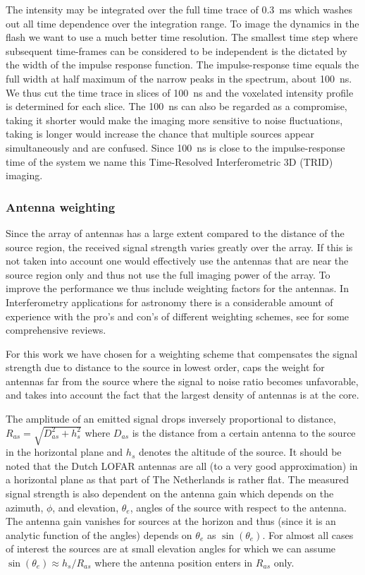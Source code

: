 The intensity may be integrated over the full time trace of 0.3~ms which washes out all time dependence over the integration range. To image the dynamics in the flash we want to use a much better time resolution. The smallest time step where subsequent time-frames can be considered to be independent is the dictated by the width of the impulse response function. The impulse-response time equals the full width at half maximum of the narrow peaks in the spectrum, about 100~ns. We thus cut the time trace in slices of 100~ns and the voxelated intensity profile is determined for each slice. The 100~ns can also be regarded as a compromise, taking it shorter would make the imaging more sensitive to noise fluctuations, taking is longer would increase the chance that multiple sources appear simultaneously and are confused. Since 100~ns is close to the impulse-response time of the system we name this Time-Resolved Interferometric 3D (TRID) imaging.


\subsubsection{Antenna weighting}

Since the array of antennas has a large extent compared to the distance of the source region, the received signal strength varies greatly over the array. If this is not taken into account one would effectively use the antennas that are near the source region only and thus not use the full imaging power of the array. To improve the performance we thus include weighting factors for the antennas. In Interferometry applications for astronomy there is a considerable amount of experience with the pro's and con's of different weighting schemes, see\cite{Briggs:1999, Yatawatta:2014} for some comprehensive reviews.

For this work we have chosen for a weighting scheme that compensates the signal strength due to distance to the source in lowest order, caps the weight for antennas far from the source where the signal to noise ratio becomes unfavorable, and takes into account the fact that the largest density of antennas is at the core.

The amplitude of an emitted signal drops inversely proportional to distance, $R_{as}=\sqrt{D_{as}^2+h_s^2}$ where $D_{as}$ is the distance from a certain antenna to the source in the horizontal plane and $h_s$ denotes the altitude of the source. It should be noted that the Dutch LOFAR antennas are all (to a very good approximation) in a horizontal plane as that part of The Netherlands is rather flat. The measured signal strength is also dependent on the antenna gain which depends on the azimuth, $\phi$, and elevation, $\theta_e$, angles of the source with respect to the antenna. The antenna gain vanishes for sources at the horizon and thus (since it is an analytic function of the angles) depends on $\theta_e$ as $\sin{(\theta_e)}$. For almost all cases of interest the sources are at small elevation angles for which we can assume $\sin{(\theta_e)}\approx h_s/R_{as}$ where the antenna position enters in $R_{as}$ only.

